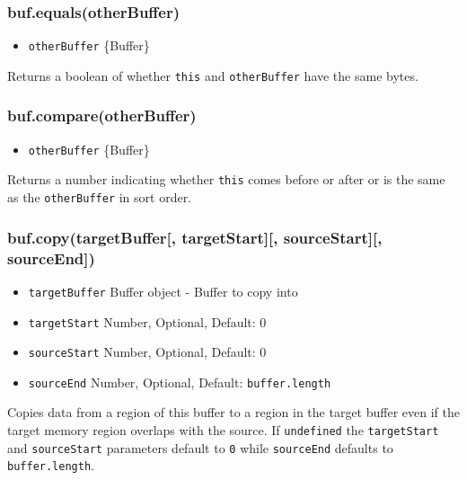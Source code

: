 \subsubsection{buf.equals(otherBuffer)}\label{buf.equalsotherbuffer}

\begin{itemize}
\itemsep1pt\parskip0pt
\item
  \texttt{otherBuffer} \{Buffer\}
\end{itemize}

Returns a boolean of whether \texttt{this} and \texttt{otherBuffer} have
the same bytes.

\subsubsection{buf.compare(otherBuffer)}\label{buf.compareotherbuffer}

\begin{itemize}
\itemsep1pt\parskip0pt
\item
  \texttt{otherBuffer} \{Buffer\}
\end{itemize}

Returns a number indicating whether \texttt{this} comes before or after
or is the same as the \texttt{otherBuffer} in sort order.

\subsubsection{buf.copy(targetBuffer{[}, targetStart{]}{[},
sourceStart{]}{[},
sourceEnd{]})}\label{buf.copytargetbuffer-targetstart-sourcestart-sourceend}

\begin{itemize}
\itemsep1pt\parskip0pt
\item
  \texttt{targetBuffer} Buffer object - Buffer to copy into
\item
  \texttt{targetStart} Number, Optional, Default: 0
\item
  \texttt{sourceStart} Number, Optional, Default: 0
\item
  \texttt{sourceEnd} Number, Optional, Default: \texttt{buffer.length}
\end{itemize}

Copies data from a region of this buffer to a region in the target
buffer even if the target memory region overlaps with the source. If
\texttt{undefined} the \texttt{targetStart} and \texttt{sourceStart}
parameters default to \texttt{0} while \texttt{sourceEnd} defaults to
\texttt{buffer.length}.

